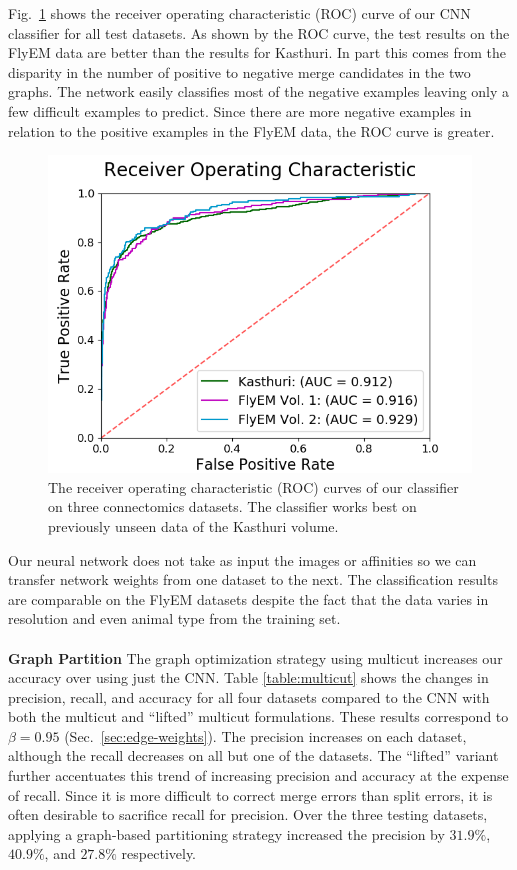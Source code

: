 Fig.~\ref{fig:receiver-operating-characteristic} shows the receiver operating characteristic (ROC) curve of our CNN classifier for all test datasets.
As shown by the ROC curve, the test results on the FlyEM data are better than the results for Kasthuri.
In part this comes from the disparity in the number of positive to negative merge candidates in the two graphs. 
The network easily classifies most of the negative examples leaving only a few difficult examples to predict.
Since there are more negative examples in relation to the positive examples in the FlyEM data, the ROC curve is greater.


\begin{figure}
	\centering
	\includegraphics[width=0.45\linewidth]{./figures/receiver-operating-characteristic.png}
	\caption{The receiver operating characteristic (ROC) curves of our classifier on three connectomics datasets. The classifier works best on previously unseen data of the Kasthuri volume.}
	\label{fig:receiver-operating-characteristic}
\end{figure}

Our neural network does not take as input the images or affinities so we can transfer network weights from one dataset to the next.
The classification results are comparable on the FlyEM datasets despite the fact that the data varies in resolution and even animal type from the training set.
\\~\\
\noindent\textbf{Graph Partition}
The graph optimization strategy using multicut increases our accuracy over using just the CNN.
Table \ref{table:multicut} shows the changes in precision, recall, and accuracy for all four datasets compared to the CNN with both the multicut and ``lifted'' multicut formulations.
These results correspond to $\beta = 0.95$ (Sec.~\ref{sec:edge-weights}). 
The precision increases on each dataset, although the recall decreases on all but one of the datasets.
The ``lifted'' variant further accentuates this trend of increasing precision and accuracy at the expense of recall. 
Since it is more difficult to correct merge errors than split errors, it is often desirable to sacrifice recall for precision.
Over the three testing datasets, applying a graph-based partitioning strategy increased the precision by $31.9\%$, $40.9\%$, and $27.8\%$ respectively. 

